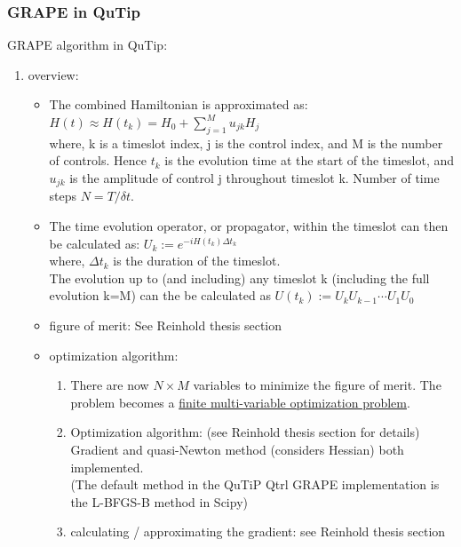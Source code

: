 \documentclass{article}
\begin{document}
\subsubsection{GRAPE in QuTip}
GRAPE algorithm in QuTip: 
\begin{enumerate}
    \item overview: \\
    \begin{itemize}
        \item The combined Hamiltonian is approximated as: $H(t) \approx H\left(t_k\right)=H_0+\sum_{j=1}^M u_{j k} H_j$ \\
        where,  k is a timeslot index, 
                j is the control index, 
                and M is the number of controls. 
                Hence $t_k$ is the evolution time at the start of the timeslot, 
                and $u_{jk}$ is the amplitude of control j throughout timeslot k.
                Number of time steps $N=T/\delta t$.\\
        \item The time evolution operator, or propagator, within the timeslot can then be calculated as:  
                $U_k:=e^{-i H\left(t_k\right) \Delta t_k}$ \\
                where, $\Delta t_k$ is the duration of the timeslot.\\
                The evolution up to (and including) any timeslot k (including the full evolution k=M) can the be calculated as 
                $U\left(t_k\right):=U_k U_{k-1} \cdots U_1 U_0$
        \item figure of merit: See Reinhold thesis section
        \item optimization algorithm: 
            \begin{enumerate}
                \item There are now $N\times M$ variables to minimize the figure of merit. 
                    The problem becomes a \underline{finite multi-variable optimization problem}.
                \item Optimization algorithm: (see Reinhold thesis section for details)\\
                    Gradient and quasi-Newton method (considers Hessian) both implemented.\\
                    (The default method in the QuTiP Qtrl GRAPE implementation is the L-BFGS-B method in Scipy)
                \item calculating / approximating the gradient: see Reinhold thesis section

            \end{enumerate}
    \end{itemize}
\end{enumerate}
\end{document}
